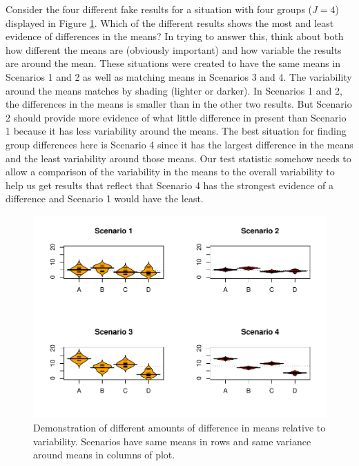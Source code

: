 \documentclass[]{book}
\begin{document}
Consider the four different fake results for a situation with four
groups (\(J=4\)) displayed in Figure \ref{fig:Figure3-3}. Which of the
different results shows the most and least evidence of differences in
the means? In trying to answer this, think about both how different the
means are (obviously important) and how variable the results are around
the mean. These situations were created to have the same means in
Scenarios 1 and 2 as well as matching means in Scenarios 3 and 4. The
variability around the means matches by shading (lighter or darker). In
Scenarios 1 and 2, the differences in the means is smaller than in the
other two results. But Scenario 2 should provide more evidence of what
little difference in present than Scenario 1 because it has less
variability around the means. The best situation for finding group
differences here is Scenario 4 since it has the largest difference in
the means and the least variability around those means. Our test
statistic somehow needs to allow a comparison of the variability in the
means to the overall variability to help us get results that reflect
that Scenario 4 has the strongest evidence of a difference and Scenario
1 would have the least.





\begin{figure}
\centering
\includegraphics{GreenwoodBanner_files/figure-latex/Figure3-3-1.pdf}
\caption{\label{fig:Figure3-3}Demonstration of different amounts of difference in means
relative to variability. Scenarios have same means in rows and same
variance around means in columns of plot.}
\end{figure}
\end{document}
